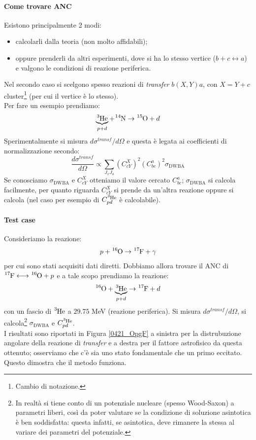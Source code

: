 \paragraph{Come trovare ANC} Esistono principalmente 2 modi:
\begin{itemize}
	\item calcolarli dalla teoria (non molto affidabili);
	\item oppure prenderli da altri esperimenti, dove si ha lo stesso vertice ($b+c \longleftrightarrow a$) e valgono le condizioni di reazione periferica.
\end{itemize}
\noindent Nel secondo caso si scelgono spesso reazioni di \textit{transfer} $b(X,Y)a$, con $X=Y+c$ cluster\footnote{Cambio di notazione.} (per cui il vertice è lo stesso).\\ 
Per fare un esempio prendiamo:
$$\underbrace{\ce{^{3}He}}_{p+d} + \ce{^{14}N} \to \ce{^{15}O}+ d$$
Sperimentalmente si misura $d\sigma^{transf}/d\Omega$ e questa è legata ai coefficienti di normalizzazione secondo:
$$\frac{d\sigma^{transf}}{d\Omega}\propto \sum_{J_x J_a} (C_{cY}^X)^2 (C_{bc}^a)^2 \sigma_\text{DWBA}$$
Se conosciamo $\sigma_\text{DWBA}$ e $C_{cY}^X$ otteniamo il valore cercato $C_{bc}^a$; $\sigma_\text{DWBA}$ si calcola facilmente, per quanto riguarda $C_{cY}^X$ si prende da un'altra reazione oppure si calcola (nel caso per esempio di $C_{pd}^{\ce{^3He}}$ è calcolabile).

\paragraph{Test case} Consideriamo la reazione:
$$p+\ce{^{16}O} \to \ce{^{17}F} + \gamma$$
per cui sono stati acquisiti dati diretti. Dobbiamo allora trovare il ANC di $\ce{^{17}F} \longleftrightarrow \ce{^{16}O} + p$ e a tale scopo prendiamo la reazione:
$$\ce{^{16}O} + \underbrace{\ce{^3He}}_{p+d} \to \ce{^{17}F} + d$$
con un fascio di $\ce{^3He}$ a $29.75$ MeV (reazione periferica). Si misura $d\sigma^{transf}/d\Omega$, si calcola\footnote{In realtà si tiene conto di un potenziale nucleare (spesso Wood-Saxon) a parametri liberi, così da poter valutare se la condizione di soluzione asintotica è ben soddisfatta: questa infatti, se asintotica, deve rimanere la stessa al variare dei parametri del potenziale.} $\sigma_\text{DWBA}$ e $C_{pd}^{\ce{^3He}}$.\\ 
I risultati sono riportati in Figura \ref{0421_OpgF} a sinistra per la distrubuzione angolare della reazione di \textit{transfer} e a destra per il fattore astrofisico da questa ottenuto; osserviamo che c'è sia uno stato fondamentale che un primo eccitato. Questo dimostra che il metodo funziona.

